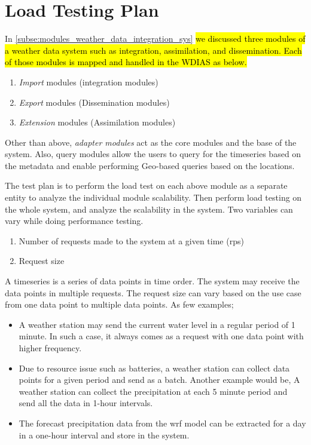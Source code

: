\section{Load Testing Plan}
\label{se:test_plan}

In \cref{subse:modules_weather_data_integration_sys} \hl{we discussed three modules of a weather data system such as integration, assimilation, and dissemination. Each of those modules is mapped and handled in the WDIAS as below.}
\begin{enumerate}
    \item \emph{Import} modules (integration modules)
    \item \emph{Export} modules (Dissemination modules)
    \item \emph{Extension} modules (Assimilation modules)
\end{enumerate}
Other than above, \emph{adapter modules} act as the core modules and the base of the system. Also, query modules allow the users to query for the timeseries based on the metadata and enable performing Geo-based queries based on the locations.

The test plan is to perform the load test on each above module as a separate entity to analyze the individual module scalability.
Then perform load testing on the whole system, and analyze the scalability in the system. Two variables can vary while doing performance testing.
\begin{enumerate}
    \item Number of requests made to the system at a given time (\acrfull{rps})
    \item Request size
\end{enumerate}
A timeseries is a series of data points in time order. The system may receive the data points in multiple requests.
The request size can vary based on the use case from one data point to multiple data points. As few examples;
\begin{itemize}
    \item A weather station may send the current water level in a regular period of 1 minute. In such a case, it always comes as a request with one data point with higher frequency.
    \item Due to resource issue such as batteries, a weather station can collect data points for a given period and send as a batch. Another example would be,
A weather station can collect the precipitation at each 5 minute period and send all the data in 1-hour intervals.
    \item The forecast precipitation data from the \acrshort{wrf} model can be extracted for a day in a one-hour interval and store in the system.
\end{itemize}

